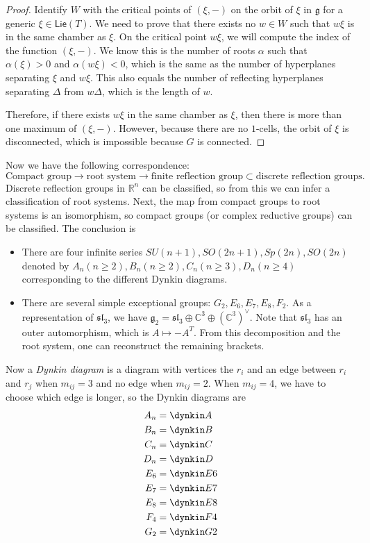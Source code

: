 \documentclass[leqno, openany]{memoir}
\theoremstyle{definition}
\theoremstyle{remark}
\theoremstyle{plain}
\theoremstyle{definition}
\theoremstyle{remark}
\newcommand{\R}{\mathbb{R}}
\newcommand{\C}{\mathbb{C}}
\newcommand{\mf}[1]{\mathfrak{#1}}
\newcommand{\ms}[1]{\mathsf{#1}}
\begin{document}
\begin{proof}
    Identify $W$ with the critical points of $(\xi, -)$ on the orbit of $\xi$ in $\mf{g}$ for a generic $\xi \in \ms{Lie}(T)$. We need to prove that there exists no $w \in W$ such that $w \xi$ is in the same chamber as $\xi$. On the critical point $w \xi$, we will compute the index of the function $(\xi, -)$. We know this is the number of roots $\alpha$ such that $\alpha(\xi) > 0$ and $\alpha(w \xi) < 0$, which is the same as the number of hyperplanes separating $\xi$ and $w \xi$. This also equals the number of reflecting hyperplanes separating $\Delta$ from $w \Delta$, which is the length of $w$.

    Therefore, if there exists $w\xi$ in the same chamber as $\xi$, then there is more than one maximum of $(\xi, -)$. However, because there are no $1$-cells, the orbit of $\xi$ is disconnected, which is impossible because $G$ is connected.
\end{proof}

Now we have the following correspondence:
\[ \text{Compact group} \to \text{root system} \to \text{finite reflection group} \subset \text{discrete reflection groups}. \]
Discrete reflection groups in $\R^n$ can be classified, so from this we can infer a classification of root systems. Next, the map from compact groups to root systems is an isomorphism, so compact groups (or complex reductive groups) can be classified. The conclusion is
\begin{itemize}
    \item There are four infinite series $SU(n+1), SO(2n+1), Sp(2n), SO(2n)$ denoted by $A_n (n \geq 2), B_n (n \geq 2), C_n (n \geq 3), D_n (n \geq 4)$ corresponding to the different Dynkin diagrams.
    \item There are several simple exceptional groups: $G_2, E_6, E_7, E_8, F_2$. As a representation of $\mf{sl}_3$, we have $\mf{g}_2 = \mf{sl}_3 \oplus \C^3 \oplus {(\C^3)}^{\vee}$. Note that $\mf{sl}_3$ has an outer automorphism, which is $A \mapsto -A^T$. From this decomposition and the root system, one can reconstruct the remaining brackets.
\end{itemize}

Now a \textit{Dynkin diagram} is a diagram with vertices the $r_i$ and an edge between $r_i$ and $r_j$ when $m_{ij} = 3$ and no edge when $m_{ij} = 2$. When $m_{ij} = 4$, we have to choose which edge is longer, so the Dynkin diagrams are
\begin{align*}
    A_n &= \dynkin A{} \\
    B_n &= \dynkin B{} \\
    C_n &= \dynkin C{} \\
    D_n &= \dynkin D{} \\
    E_6 &= \dynkin E6 \\
    E_7 &= \dynkin E7 \\
    E_8 &= \dynkin E8 \\
    F_4 &= \dynkin F4 \\
    G_2 &= \dynkin G2
\end{align*}
\end{document}

